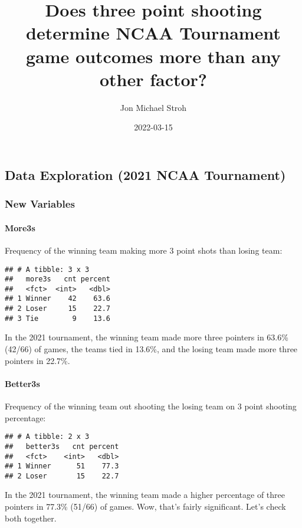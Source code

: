 \documentclass[
]{article}
\title{Does three point shooting determine NCAA Tournament game outcomes
more than any other factor?}
\author{Jon Michael Stroh}
\date{2022-03-15}
\begin{document}
\maketitle

\hypertarget{data-exploration-2021-ncaa-tournament}{%
\subsection{Data Exploration (2021 NCAA
Tournament)}\label{data-exploration-2021-ncaa-tournament}}

\hypertarget{new-variables}{%
\subsubsection{New Variables}\label{new-variables}}

\hypertarget{more3s}{%
\paragraph{More3s}\label{more3s}}

Frequency of the winning team making more 3 point shots than losing
team:

\begin{verbatim}
## # A tibble: 3 x 3
##   more3s   cnt percent
##   <fct>  <int>   <dbl>
## 1 Winner    42    63.6
## 2 Loser     15    22.7
## 3 Tie        9    13.6
\end{verbatim}

In the 2021 tournament, the winning team made more three pointers in
63.6\% (42/66) of games, the teams tied in 13.6\%, and the losing team
made more three pointers in 22.7\%.

\hypertarget{better3s}{%
\paragraph{Better3s}\label{better3s}}

Frequency of the winning team out shooting the losing team on 3 point
shooting percentage:

\begin{verbatim}
## # A tibble: 2 x 3
##   better3s   cnt percent
##   <fct>    <int>   <dbl>
## 1 Winner      51    77.3
## 2 Loser       15    22.7
\end{verbatim}

In the 2021 tournament, the winning team made a higher percentage of
three pointers in 77.3\% (51/66) of games. Wow, that's fairly
significant. Let's check both together.
\end{document}
